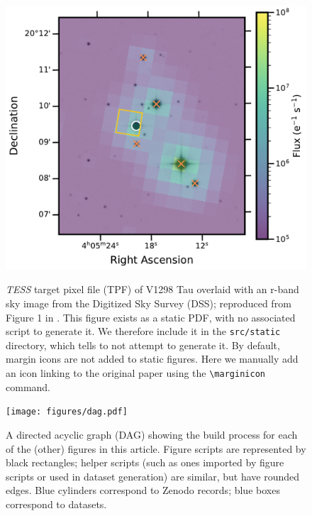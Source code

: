 \documentclass[twocolumn]{aastex631}
\begin{document}
\begin{figure}[ht!]
    \begin{centering}
        \includegraphics[width=\linewidth]{static/TESSaperture.pdf}
        \caption{
            \emph{TESS} target pixel file (TPF) of V1298 Tau
            overlaid with an r-band sky image from the Digitized Sky Survey (DSS);
            reproduced from Figure 1 in \citet{Feinstein2021}.
            This figure exists as a static PDF, with no associated script to
            generate it.
            We therefore include it in the \texttt{src/static} directory, which tells \showyourwork to not attempt to generate it. 
            By default, margin icons are not added to static figures.
            Here we manually add an icon linking to the original paper using the \texttt{\textbackslash marginicon} command.
        }
        \label{fig:eclipse}
    \end{centering}
\end{figure}

\begin{figure}[ht!]
    \begin{centering}
        \texttt{[image: figures/dag.pdf]}
        \caption{
            A directed acyclic graph (DAG) showing the build process for each of the (other) figures in this article. 
            Figure scripts are represented by black rectangles; helper scripts (such as ones imported by figure scripts or used in dataset generation) are similar, but have rounded edges.
            Blue cylinders correspond to Zenodo records; blue boxes correspond to datasets.
        }
        \label{fig*:dag}
    \end{centering}
\end{figure}


\end{document}
